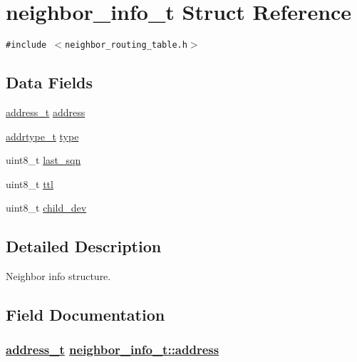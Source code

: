 \hypertarget{structneighbor__info__t}{
\section{neighbor\_\-info\_\-t Struct Reference}
\label{structneighbor__info__t}
}
{\tt \#include $<$neighbor\_\-routing\_\-table.h$>$}

\subsection*{Data Fields}
\begin{CompactItemize}
\item 
\hyperlink{address_8h_65ce5a1faf29ab669a1d3dc6ce26c2ab}{address\_\-t} \hyperlink{structneighbor__info__t_790af312906f9cd4f8859bae27cc7780}{address}
\item 
\hyperlink{address_8h_faf76b5591da0abd0584dec411d0551d}{addrtype\_\-t} \hyperlink{structneighbor__info__t_fc0346ec8be9b8c1fd4f30dd92d1668a}{type}
\item 
uint8\_\-t \hyperlink{structneighbor__info__t_5298c5fd0a4147b239272dcb5c842922}{last\_\-sqn}
\item 
uint8\_\-t \hyperlink{structneighbor__info__t_4ca0945404f5041f21776c404fb38c88}{ttl}
\item 
uint8\_\-t \hyperlink{structneighbor__info__t_91a0e763d984ae839c8e5e0ed74cb108}{child\_\-dev}
\end{CompactItemize}


\subsection{Detailed Description}
Neighbor info structure. 



\subsection{Field Documentation}
\hypertarget{structneighbor__info__t_790af312906f9cd4f8859bae27cc7780}{
\subsubsection[address]{\setlength{\rightskip}{0pt plus 5cm}\hyperlink{address_8h_65ce5a1faf29ab669a1d3dc6ce26c2ab}{address\_\-t} \hyperlink{structneighbor__info__t_790af312906f9cd4f8859bae27cc7780}{neighbor\_\-info\_\-t::address}}}
\label{structneighbor__info__t_790af312906f9cd4f8859bae27cc7780}


